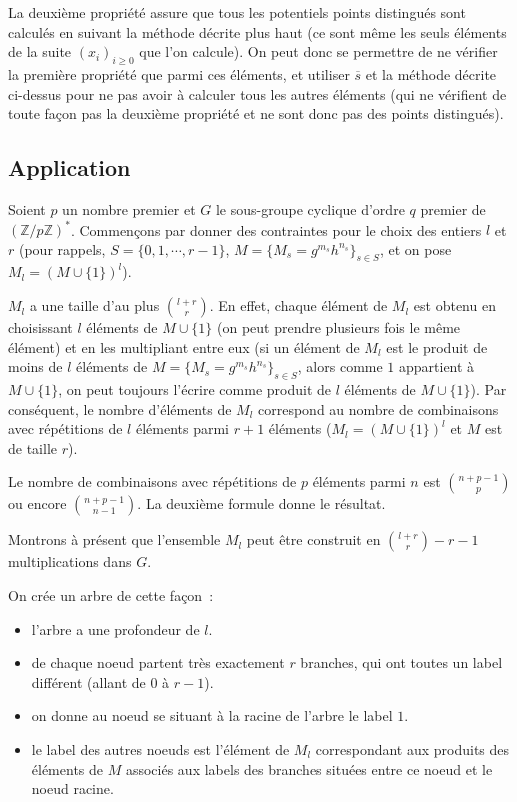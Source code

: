 		La deuxième propriété assure que tous les potentiels points distingués sont calculés en suivant la méthode décrite plus haut (ce sont même les seuls éléments de la suite $(x_i)_{i \ge 0}$ que l'on calcule). On peut donc se permettre de ne vérifier la première propriété que parmi ces éléments, et utiliser $\overline{s}$ et la méthode décrite ci-dessus pour ne pas avoir à calculer tous les autres éléments (qui ne vérifient de toute façon pas la deuxième propriété et ne sont donc pas des points distingués).
		
		\subsection{Application}
		Soient $p$ un nombre premier et $G$ le sous-groupe cyclique d'ordre $q$ premier de $(\mathbb{Z}/p\mathbb{Z})^*$. Commençons par donner des contraintes pour le choix des entiers $l$ et $r$ (pour rappels, $S = \{0,1,\cdots,r-1\}$, $M=\{M_s = g^{m_s} h^{n_s}\}_{s \in S}$, et on pose $M_l = (M\cup\{1\})^l$).
		
		$M_l$ a une taille d'au plus $\binom{l+r}{r}$. En effet, chaque élément de $M_l$ est obtenu en choisissant $l$ éléments de $M\cup\{1\}$ (on peut prendre plusieurs fois le même élément) et en les multipliant entre eux (si un élément de $M_l$ est le produit de moins de $l$ éléments de $M = \{M_s = g^{m_s} h^{n_s}\}_{s \in S}$, alors comme $1$ appartient à $M\cup\{1\}$, on peut toujours l'écrire comme produit de $l$ éléments de $M\cup\{1\}$). Par conséquent, le nombre d'éléments de $M_l$ correspond au nombre de combinaisons avec répétitions de $l$ éléments parmi $r + 1$ éléments ($M_l = (M\cup\{1\})^l$ et $M$ est de taille $r$).
		
		Le nombre de combinaisons avec répétitions de $p$ éléments parmi $n$ est $\binom{n+p-1}{p}$ ou encore $\binom{n+p-1}{n-1}$. La deuxième formule donne le résultat.
		
		Montrons à présent que l'ensemble $M_l$ peut être construit en $\binom{l+r}{r} - r - 1$ multiplications dans $G$.
		
		On crée un arbre de cette façon~:
		
		\begin{itemize}
		\item l'arbre a une profondeur de $l$.
		\item de chaque noeud partent très exactement $r$ branches, qui ont toutes un label différent (allant de $0$ à $r - 1$).
		\item on donne au noeud se situant à la racine de l'arbre le label $1$.
		\item le label des autres noeuds est l'élément de $M_l$ correspondant aux produits des éléments de $M$ associés aux labels des branches situées entre ce noeud et le noeud racine.
		\end{itemize}
		
